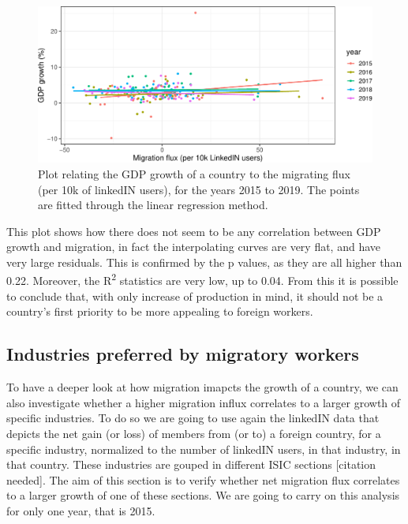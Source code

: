 \documentclass[
]{article}
\begin{document}
\begin{figure}
\centering
\includegraphics{main_files/figure-latex/growthVSmigration-1.pdf}
\caption{Plot relating the GDP growth of a country to the migrating flux
(per 10k of linkedIN users), for the years 2015 to 2019. The points are
fitted through the linear regression method.
\label{fig:growthVSmigration}}
\end{figure}

This plot shows how there does not seem to be any correlation between
GDP growth and migration, in fact the interpolating curves are very
flat, and have very large residuals. This is confirmed by the p values,
as they are all higher than 0.22. Moreover, the R\textsuperscript{2}
statistics are very low, up to 0.04. From this it is possible to
conclude that, with only increase of production in mind, it should not
be a country's first priority to be more appealing to foreign workers.

\hypertarget{industries-preferred-by-migratory-workers}{%
\subsection{Industries preferred by migratory
workers}\label{industries-preferred-by-migratory-workers}}

To have a deeper look at how migration imapcts the growth of a country,
we can also investigate whether a higher migration influx correlates to
a larger growth of specific industries. To do so we are going to use
again the linkedIN data that depicts the net gain (or loss) of members
from (or to) a foreign country, for a specific industry, normalized to
the number of linkedIN users, in that industry, in that country. These
industries are gouped in different ISIC sections {[}citation needed{]}.
The aim of this section is to verify whether net migration flux
correlates to a larger growth of one of these sections. We are going to
carry on this analysis for only one year, that is 2015.
\end{document}
